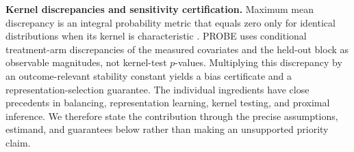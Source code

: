 \textbf{Kernel discrepancies and sensitivity certification.} Maximum mean discrepancy is an integral probability metric that equals zero only for identical distributions when its kernel is characteristic \citep{gretton2012kernel}. PROBE uses conditional treatment-arm discrepancies of the measured covariates and the held-out block as observable magnitudes, not kernel-test $p$-values. Multiplying this discrepancy by an outcome-relevant stability constant yields a bias certificate and a representation-selection guarantee. The individual ingredients have close precedents in balancing, representation learning, kernel testing, and proximal inference. We therefore state the contribution through the precise assumptions, estimand, and guarantees below rather than making an unsupported priority claim.

